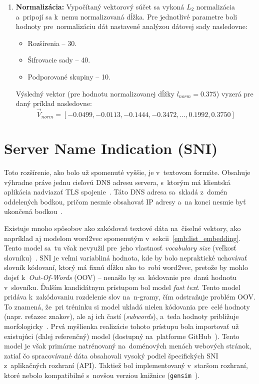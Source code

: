 \begin{enumerate}
    \item \textbf{Normalizácia:} Vypočítaný vektorový súčet sa vykoná $L_2$ normalizácia a~pripojí sa k~nemu normalizovaná dĺžka. Pre jednotlivé parametre boli hodnoty pre~normalizáciu dát nastavené analýzou dátovej sady nasledovne: 
    \begin{itemize}
        \item Rozšírenia -- 30.
        \item Śifrovacie sady -- 40.
        \item Podporované skupiny -- 10.
    \end{itemize}

    Výsledný vektor (pre hodnotu normalizovanej dĺžky $l_{norm} = 0.375$) vyzerá pre daný príklad nasledovne:
   $$\vec{V}_{norm} = [-0.0499, -0.0113, -0.1444, -0.3472, \dots, 0.1992, 0.3750]$$
\end{enumerate}

\section{Server Name Indication (SNI)}\label{emb:SNI}
Toto rozšírenie, ako bolo už spomenuté vyššie, je v~textovom formáte. Obsahuje výhradne práve jednu cieľovú DNS adresu servera, s~ktorým má klientská aplikácia nadviazať TLS spojenie~\cite{rfc6066}. Táto DNS adresa sa~skladá z~domén oddelených bodkou, pričom nesmie obsahovať IP adresy a~na konci nesmie byť ukončená bodkou~\cite{rfc1034}.

Existuje mnoho spôsobov ako zakódovať textové dáta na~číselné vektory, ako napríklad aj modelom word2vec spomenutým v~sekcii~\ref{emb:list_embedding}. Tento model sa~tu však nevyužil pre~jeho vlastnosť \textit{vocabulary size} (veľkosť slovníku)~\cite{NLP}. SNI je veľmi variabliná hodnota, kde by bolo nepraktické uchovávať slovník kódovaní, ktorý má fixnú dĺžku ako to~robí word2vec, pretože by mohlo dojsť k~\textit{Out-Of-Words} (OOV) -- nenašlo by sa~kódovanie pre~danú hodnotu v~slovníku. Ďalším kandidátnym prístupom bol model \textit{fast text}. Tento model pridáva k~zakódovaniu rozdelenie slov na~n-gramy, čím odstraňuje problém OOV. To znamená, že~pri tréninku si model ukladá nielen kódovania pre~celé hodnoty (napr. reťazec znakov), ale aj ich častí (\textit{subwords}), a~teda hodnoty približuje morfologicky~\cite{fasttext}. Prvá myšlienka realizácie tohoto prístupu bola importovať už existujúci (ďalej referenčný) model (dostupný na~platforme GitHub~\cite{dns-vsm}). Tento model je však primárne natrénovaný na~doménových menách webových stránok, zatiaľ čo spracovávané dáta obsahovali vysoký podiel špecifických SNI z~aplikačných rozhraní (API). Taktiež bol implementovaný v~staršom rozhraní, ktoré nebolo kompatibilné s~novšou verziou knižnice (\texttt{gensim}~\cite{gensim_migration_guide}). 

